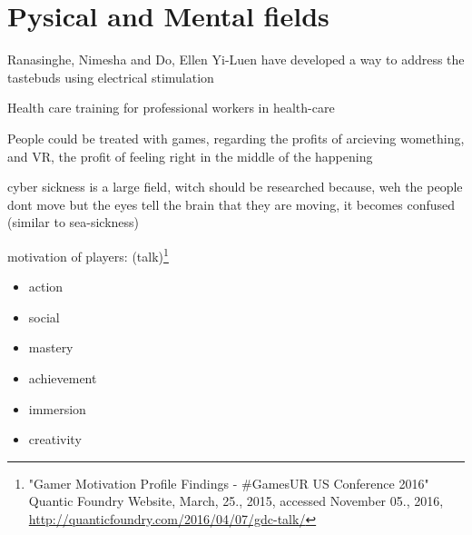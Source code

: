 \section{Pysical and Mental fields}

Ranasinghe, Nimesha and Do, Ellen Yi-Luen have developed a way to address the tastebuds using electrical stimulation \cite{Ranasinghe:2016:VSS:2984751.2985729}

Health care training for professional workers in health-care

People could be treated with games, regarding the profits of arcieving womething, and VR, the profit of feeling right in the middle of the happening

cyber sickness is a large field, witch should be researched because, weh the people dont move but the eyes tell the brain that they are moving, it becomes confused (similar to sea-sickness)

motivation of players: (talk)\footnote{"Gamer Motivation Profile Findings - \#GamesUR US Conference 2016" Quantic Foundry Website, March, 25., 2015, accessed November 05., 2016, \url{http://quanticfoundry.com/2016/04/07/gdc-talk/}}
\begin{itemize}
	\item action
	\item social
	\item mastery
	\item achievement
	\item immersion
	\item creativity
\end{itemize}
